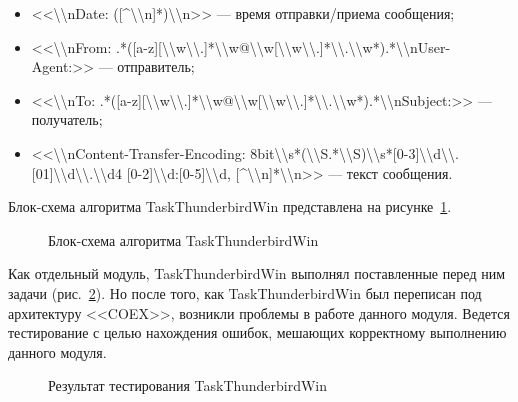 \begin{itemize}
  \item <<\textbackslash \textbackslash nDate: ([\textasciicircum \textbackslash \textbackslash n]*)\textbackslash \textbackslash n>> --- время отправки/приема сообщения;
  
  \item <<\textbackslash \textbackslash nFrom: .*([a-z][\textbackslash \textbackslash w\textbackslash \textbackslash .]*\textbackslash \textbackslash w@\textbackslash \textbackslash w[\textbackslash \textbackslash w\textbackslash \textbackslash .]*\textbackslash \textbackslash .\textbackslash \textbackslash w*).*\textbackslash \textbackslash nUser-Agent:>> --- отправитель;
  
  \item <<\textbackslash \textbackslash nTo: .*([a-z][\textbackslash \textbackslash w\textbackslash \textbackslash .]*\textbackslash \textbackslash w@\textbackslash \textbackslash w[\textbackslash \textbackslash w\textbackslash \textbackslash .]*\textbackslash \textbackslash .\textbackslash \textbackslash w*).*\textbackslash \textbackslash nSubject:>> --- получатель;
  
  \item <<\textbackslash \textbackslash nContent-Transfer-Encoding: 8bit\textbackslash \textbackslash s*(\textbackslash \textbackslash S.*\textbackslash \textbackslash S)\textbackslash \textbackslash s*[0-3]\textbackslash \textbackslash d\textbackslash \textbackslash .[01]\textbackslash \textbackslash d\textbackslash \textbackslash .\textbackslash \textbackslash d{4} [0-2]\textbackslash \textbackslash d:[0-5]\textbackslash \textbackslash d, [\textasciicircum \textbackslash \textbackslash n]*\textbackslash \textbackslash n>> --- текст сообщения.
\end{itemize}

Блок-схема алгоритма TaskThunderbirdWin представлена на рисунке~\ref{teresh_6:teresh_6}.

\begin{figure}[h!]
\caption{ Блок-схема алгоритма TaskThunderbirdWin }
\label{teresh_6:teresh_6}
\end{figure}

Как отдельный модуль, TaskThunderbirdWin выполнял поставленные перед ним задачи (рис.~\ref{teresh_7:teresh_7}). Но после того, как TaskThunderbirdWin был переписан под архитектуру <<COEX>>, возникли проблемы в работе данного модуля. Ведется тестирование с целью нахождения ошибок, мешающих корректному выполнению данного модуля.

\begin{figure}[h!]
\caption{ Результат тестирования TaskThunderbirdWin }
\label{teresh_7:teresh_7}
\end{figure}

\clearpage
